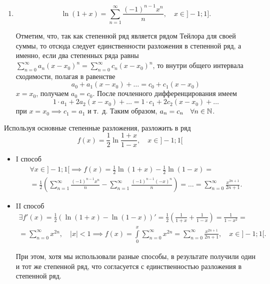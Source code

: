\documentclass[../../main.tex]{subfiles}
\begin{document}
\begin{enumerate}
        \item \[\ln(1 + x) = \sum\limits_{n = 1}^{\infty}\frac{(-1)^{n - 1}x^n}
        {n}, \quad x \in ]-1; 1].\]
        
        Отметим, что, так как степенной ряд является рядом Тейлора для своей 
        суммы, то отсюда следует единственности разложения в степенной ряд, а 
        именно, если два степенных ряда равны $\sum\limits_{n = 0}^{\infty} 
        a_n(x - x_0)^n = \sum\limits_{n = 0}^{\infty} c_n(x-x_0)^n$, то внутри 
        общего интервала сходимости, полагая в равенстве
        \[ a_0 + a_1(x - x_0) + \ldots = c_0 + c_1(x - x_0) \]
        $x = x_0$, получаем $a_0 = c_0$. После почленного дифференцирования
        имеем\[1 \cdot a_1 + 2a_2(x - x_0) + \ldots = 
        1 \cdot c_1 + 2c_2(x - x_0) + \ldots \]
        при $x = x_0 \implies c_1 = a_1$ и т.~д. Таким образом, 
        $a_n = c_n \quad \forall n \in \mathbb{N}$. 
    \end{enumerate}
    
    \begin{example}
        Используя основные степенные разложения, разложить в ряд
        \[f(x) = \frac12\ln\frac{1+x}{1-x},\quad x \in ]-1; 1[ \]
        \begin{itemize}
            \item I способ
            \begin{multline*}
                \forall x \in ]-1; 1[ \implies f(x) = \frac12 \ln(1+x) - 
                \frac12 
                \ln(1-x) = \\ = \frac12 \left(\sum\limits_{n = 1}^{\infty} 
                \frac{(-1)^{n-1}x^n}{n} - \sum\limits_{n = 1}^{\infty} 
                \frac{(-1)^{n - 1}(-x)^n}{n}\right) = \ldots = 
                \sum\limits_{n = 0}^{\infty}
                \frac{x^{2n+1}}{2n+1}.
            \end{multline*}
            
            \item II способ
            \begin{multline*}
                \exists f'(x) = \frac12 (\ln(1+x) - \ln(1-x))' = \frac12 
                \left(\frac{1}{1+x} + \frac{1}{1-x} \right) = \frac{1}{1-x^2}
                = \\ = \sum\limits_{n = 0}^{\infty} x^{2n}, \quad |x| < 1 
                \implies f(x) = \int\limits_{0}^{x} 
                \sum\limits_{n = 0}^{\infty} x^{2n} = 
                \sum\limits_{n = 0}^{\infty} \frac{x^{2n + 1}}{2n + 1}, 
                \quad x \in ]-1;1[.
            \end{multline*}
            
            При этом, хотя мы использовали разные способы, в результате 
            получили один и тот же степенной ряд, что согласуется с 
            единственностью разложения в степенной ряд.
        \end{itemize}
    \end{example}
\end{document}
